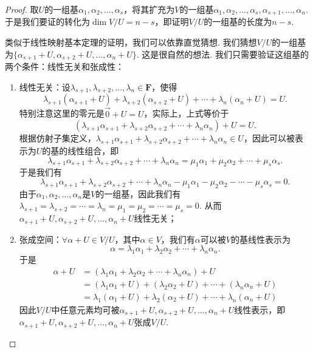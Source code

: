 \begin{proof}
    取$U$的一组基$\alpha_1,\alpha_2,\ldots,\alpha_s$，将其扩充为$V$的一组基$\alpha_1,\alpha_2,\ldots,\alpha_s,\alpha_{s+1},\ldots,\alpha_n$. 于是我们要证的转化为$\dim V/U=n-s$，即证明$V/U$的一组基的长度为$n-s$.

    类似于线性映射基本定理的证明，我们可以依靠直觉猜想. 我们猜想$V/U$的一组基为$\{\alpha_{s+1}+U,\alpha_{s+2}+U,\ldots,\alpha_n+U\}$. 这是很自然的想法. 我们只需要验证这组基的两个条件：线性无关和张成性：
    \begin{enumerate}
        \item 线性无关：设$\lambda_{s+1},\lambda_{s+2},\ldots,\lambda_n\in\mathbf{F}$，使得
              \[\lambda_{s+1}(\alpha_{s+1}+U)+\lambda_{s+2}(\alpha_{s+2}+U)+\cdots+\lambda_n(\alpha_n+U)=U.\]
              特别注意这里的零元是$\vec{0}+U=U$，实际上，上式等价于
              \[(\lambda_{s+1}\alpha_{s+1}+\lambda_{s+2}\alpha_{s+2}+\cdots+\lambda_n\alpha_n)+U=U.\]
              根据仿射子集定义，$\lambda_{s+1}\alpha_{s+1}+\lambda_{s+2}\alpha_{s+2}+\cdots+\lambda_n\alpha_n\in U$，因此可以被表示为$U$的基的线性组合，即
              \[\lambda_{s+1}\alpha_{s+1}+\lambda_{s+2}\alpha_{s+2}+\cdots+\lambda_n\alpha_n=\mu_1\alpha_1+\mu_2\alpha_2+\cdots+\mu_s\alpha_s.\]
              于是我们有
              \[\lambda_{s+1}\alpha_{s+1}+\lambda_{s+2}\alpha_{s+2}+\cdots+\lambda_n\alpha_n-\mu_1\alpha_1-\mu_2\alpha_2-\cdots-\mu_s\alpha_s=0.\]
              由于$\alpha_1,\alpha_2,\ldots,\alpha_n$是$V$的一组基，因此我们有$\lambda_{s+1}=\lambda_{s+2}=\cdots=\lambda_n=\mu_1=\mu_2=\cdots=\mu_s=0$. 从而$\alpha_{s+1}+U,\alpha_{s+2}+U,\ldots,\alpha_n+U$线性无关；

        \item 张成空间：$\forall\alpha+U\in V/U$，其中$\alpha\in V$，我们有$\alpha$可以被$V$的基线性表示为
              \[\alpha=\lambda_1\alpha_1+\lambda_2\alpha_2+\cdots+\lambda_n\alpha_n.\]
              于是
              \begin{align*}
                  \alpha+U & =(\lambda_1\alpha_1+\lambda_2\alpha_2+\cdots+\lambda_n\alpha_n)+U         \\
                           & =(\lambda_1\alpha_1+U)+(\lambda_2\alpha_2+U)+\cdots+(\lambda_n\alpha_n+U) \\
                           & =\lambda_1(\alpha_1+U)+\lambda_2(\alpha_2+U)+\cdots+\lambda_n(\alpha_n+U)
              \end{align*}
              因此$V/U$中任意元素均可被$\alpha_{s+1}+U,\alpha_{s+2}+U,\ldots,\alpha_n+U$线性表示，即$\alpha_{s+1}+U,\alpha_{s+2}+U,\ldots,\alpha_n+U$张成$V/U$.
    \end{enumerate}
\end{proof}

